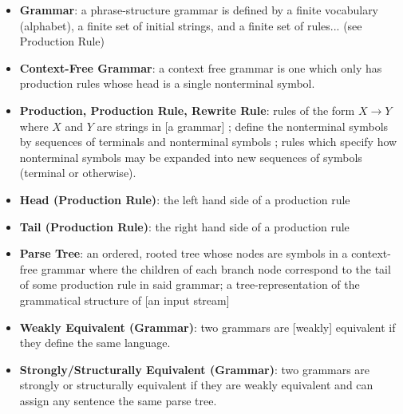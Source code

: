 \documentclass[11pt]{article}
\begin{document}
\begin{itemize}
\item \textbf{Grammar}: a phrase-structure grammar is defined by a finite vocabulary (alphabet), a finite set of
initial strings, and a finite set of rules... \cite{chomsky} (see Production Rule)
\item \textbf{Context-Free Grammar}: a context free grammar is one which only has production rules whose head is a single nonterminal symbol.
\cite{compiler, anatomy, formal_langs}
\item \textbf{Production, Production Rule, Rewrite Rule}: rules of the form $X \rightarrow Y$ where
$X$ and $Y$ are strings in [a grammar]  \cite{chomsky};
define the nonterminal symbols by sequences of terminals and nonterminal symbols \cite{compiler};
rules which specify how nonterminal symbols may be expanded into new sequences of symbols (terminal or otherwise).
\item \textbf{Head (Production Rule)}: the left hand side of a production rule
\item \textbf{Tail (Production Rule)}: the right hand side of a production rule
\item \textbf{Parse Tree}: an ordered, rooted tree whose nodes are symbols in a context-free grammar where the 
children of each branch node correspond to the tail of some production rule in said grammar;
a tree-representation of the grammatical structure of [an input stream] \cite{anatomy}
\item \textbf{Weakly Equivalent (Grammar)}: two grammars are [weakly] equivalent if they define the same language.\cite{reghizzi}
\item \textbf{Strongly/Structurally Equivalent (Grammar)}: two grammars are strongly or structurally equivalent
if they are weakly equivalent and can assign any sentence the same parse tree. \cite{reghizzi}
\end{itemize}

{}

\end{document}
